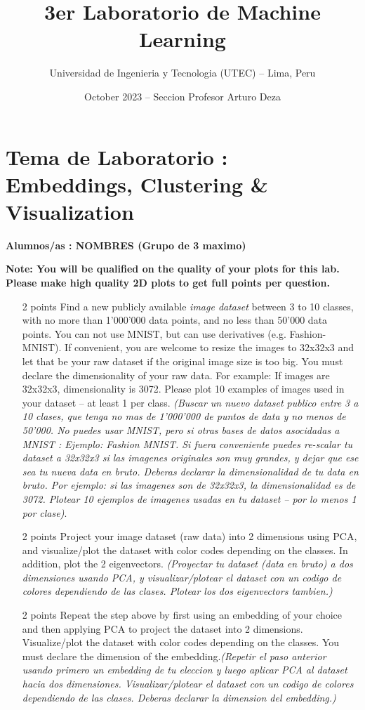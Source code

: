 \documentclass{article}
\title{3er Laboratorio de Machine Learning}
\author{Universidad de Ingenieria y Tecnologia (UTEC) -- Lima, Peru}
\date{October 2023 -- Seccion Profesor Arturo Deza}
\begin{document}
    \maketitle
    \small

    \section*{Tema de Laboratorio : Embeddings, Clustering \& Visualization}

    \textbf{Alumnos/as : NOMBRES (Grupo de 3 maximo)}

    \textbf{Note: You will be qualified on the quality of your plots for this lab. Please make high quality 2D plots to get full points per question.}

    \begin{enumerate}
        \item [2 points] Find a new publicly available \textit{image dataset} between 3 to 10 classes, with no more than 1'000'000 data points, and no less than 50'000 data points. You can not use MNIST, but can use derivatives (e.g. Fashion-MNIST). If convenient, you are welcome to resize the images to 32x32x3 and let that be your raw dataset if the original image size is too big. You must declare the dimensionality of your raw data. For example: If images are 32x32x3, dimensionality is 3072. Please plot 10 examples of images used in your dataset -- at least 1 per class. \textit{(Buscar un nuevo dataset publico entre 3 a 10 clases, que tenga no mas de 1'000'000 de puntos de data y no menos de 50'000. No puedes usar MNIST, pero si otras bases de datos asocidadas a MNIST : Ejemplo: Fashion MNIST. Si fuera conveniente puedes re-scalar tu dataset a 32x32x3 si las imagenes originales son muy grandes, y dejar que ese sea tu nueva data en bruto. Deberas declarar la dimensionalidad de tu data en bruto. Por ejemplo: si las imagenes son de 32x32x3, la dimensionalidad es de 3072. Plotear 10 ejemplos de imagenes usadas en tu dataset -- por lo menos 1 por clase)}.

        \item [2 points] Project your image dataset (raw data) into 2 dimensions using PCA, and visualize/plot the dataset with color codes depending on the classes. In addition, plot the 2 eigenvectors. \textit{(Proyectar tu dataset (data en bruto) a dos dimensiones usando PCA, y visualizar/plotear el dataset con un codigo de colores dependiendo de las clases. Plotear los dos eigenvectors tambien.)}

        \item [2 points] Repeat the step above by first using an embedding of your choice and then applying PCA to project the dataset into 2 dimensions. Visualize/plot the dataset with color codes depending on the classes. You must declare the dimension of the embedding.\textit{(Repetir el paso anterior usando primero un embedding de tu eleccion y luego aplicar PCA al dataset hacia dos dimensiones. Visualizar/plotear el dataset con un codigo de colores dependiendo de las clases. Deberas declarar la dimension del embedding.)}


\end{enumerate}
\end{document}
